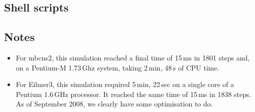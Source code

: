 \subsection{Shell scripts}
\label{sharp-sh-files}
\topbar

\bottombar

\noindent
\topbar

\bottombar

\noindent
\topbar

\bottombar

\subsection{Notes}
\begin{itemize}
\item For mbcns2, this simulation reached a final time of 15\,ms in 1801 steps and,
  on a Pentium-M 1.73\,Ghz system, taking 2\,min, 48\,s of CPU time.
\item For Eilmer3, this simulation required 5\,min, 22\,sec on a single core of 
  a Pentium 1.6\,GHz processor.
  It reached the same time of 15\,ms in 1838 steps.
  As of September 2008, we clearly have some optimisation to do.
\end{itemize}
